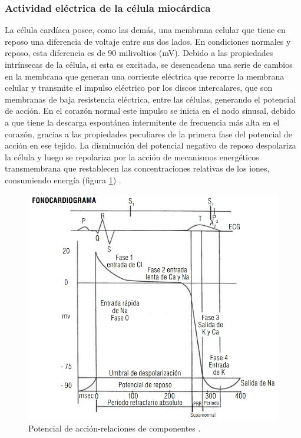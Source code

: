 \documentclass[12pt,letterpaper,oneside,openright]{book}
\begin{document}
	\subsubsection*{Actividad eléctrica de la célula miocárdica}
	La célula cardíaca posee, como las demás, una membrana celular que tiene en reposo una diferencia de voltaje entre sus dos lados. En condiciones normales y reposo, esta diferencia es de 90 milivoltios (mV). Debido a las propiedades intrínsecas de la célula, si esta es excitada, se desencadena una serie de cambios en la membrana que generan una corriente eléctrica que recorre la membrana celular y transmite el impulso eléctrico por los discos intercalares, que son membranas de baja resistencia eléctrica, entre las células, generando el potencial de acción. En el corazón normal este impulso se inicia en el nodo sinusal, debido a que tiene la descarga espontánea intermitente de frecuencia más alta en el corazón, gracias a las propiedades peculiares de la primera fase del potencial de acción en ese tejido. La disminución del potencial negativo de reposo despolariza la célula y luego se repolariza por la acción de mecanismos energéticos transmembrana que restablecen las concentraciones relativas de los iones, consumiendo energía (figura \ref{fig:fonocardio}) \cite{textCardi}.
	\begin{figure}[h]
		\centering
		\includegraphics[width=0.8\linewidth]{Sem_1/figuras/fonocardiograma.jpeg}
		\caption{Potencial de acción-relaciones de componentes \cite{textCardi}.}
		\label{fig:fonocardio}
	\end{figure}
\end{document}
